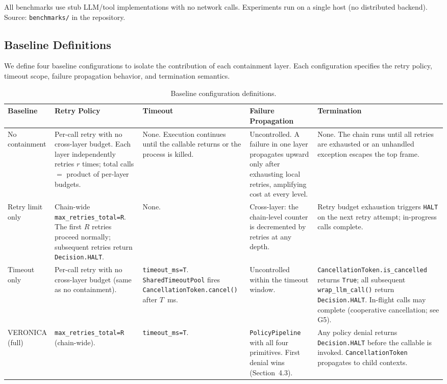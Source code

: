 \documentclass[11pt]{article}
\begin{document}
All benchmarks use stub LLM/tool implementations with no network calls.
Experiments run on a single host (no distributed backend). Source:
\texttt{benchmarks/} in the repository.

\subsection{Baseline Definitions}

We define four baseline configurations to isolate the contribution of each
containment layer. Each configuration specifies the retry policy, timeout
scope, failure propagation behavior, and termination semantics.

\begin{table}[!ht]
\centering
\footnotesize
\caption{Baseline configuration definitions.}
\label{tab:baselines}
\begin{tabular}{@{}p{1.8cm}p{3cm}p{2.2cm}p{3cm}p{3cm}@{}}
\toprule
\textbf{Baseline} & \textbf{Retry Policy} & \textbf{Timeout} &
\textbf{Failure Propagation} & \textbf{Termination} \\
\midrule
No containment &
Per-call retry with no cross-layer budget. Each layer independently retries
$r$ times; total calls $=$ product of per-layer budgets. &
None. Execution continues until the callable returns or the process is
killed. &
Uncontrolled. A failure in one layer propagates upward only after exhausting
local retries, amplifying cost at every level. &
None. The chain runs until all retries are exhausted or an unhandled exception
escapes the top frame. \\
\midrule
Retry limit only &
Chain-wide \texttt{max\_retries\_total=R}. The first $R$ retries proceed
normally; subsequent retries return \texttt{Decision.HALT}. &
None. &
Cross-layer: the chain-level counter is decremented by retries at any
depth. &
Retry budget exhaustion triggers \texttt{HALT} on the next retry attempt;
in-progress calls complete. \\
\midrule
Timeout only &
Per-call retry with no cross-layer budget (same as no containment). &
\texttt{timeout\_ms=T}. \texttt{SharedTimeoutPool} fires
\texttt{CancellationToken.cancel()} after $T$~ms. &
Uncontrolled within the timeout window. &
\texttt{CancellationToken.is\_cancelled} returns \texttt{True}; all
subsequent \texttt{wrap\_llm\_call()} return \texttt{Decision.HALT}.
In-flight calls may complete (cooperative cancellation; see G5). \\
\midrule
VERONICA (full) &
\texttt{max\_retries\_total=R} (chain-wide). &
\texttt{timeout\_ms=T}. &
\texttt{PolicyPipeline} with all four primitives. First denial wins
(Section~4.3). &
Any policy denial returns \texttt{Decision.HALT} before the callable is
invoked. \texttt{CancellationToken} propagates to child contexts. \\
\bottomrule
\end{tabular}
\end{table}
\end{document}
